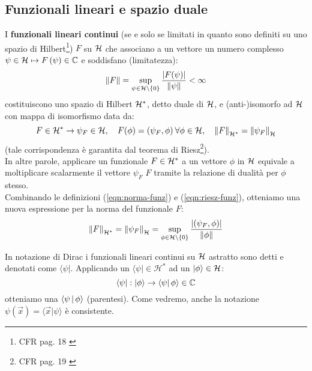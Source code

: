 \documentclass[FisicaTeorica.tex]{subfiles}
\begin{document}
\subsection{Funzionali lineari e spazio duale}
I \textbf{funzionali lineari continui} (se e solo se limitati in quanto sono definiti su uno spazio di Hilbert\footnote{CFR pag. 18 \cite{spazi_hilbert}}) $F$ su $\mathcal{H}$ che associano a un vettore un numero complesso $\psi\in\mathcal{H}\mapsto F\left(\psi\right)\in \mathbb{C}$ e soddisfano (limitatezza):
\begin{equation}
    \left\lVert F\right\rVert = \sup_{\psi \in \mathcal{H}\setminus \{0\}} \frac{|F(\psi)|}{\left\lVert\psi\right\rVert} < \infty
    \label{eqn:norma-funz}
\end{equation}
costituiscono uno spazio di Hilbert $\mathcal{H}^*$, detto duale di $\mathcal{H}$, e (anti-)isomorfo ad $\mathcal{H}$ con mappa di isomorfismo data da:
\begin{equation}
F\in \mathcal{H}^*\rightarrow \psi_F\in \mathcal{H}, \quad F(\phi) = (\psi_F, \phi)\> \forall \phi \in \mathcal{H}, \quad \left\lVert F\right\rVert_{\mathcal{H}^*}=\left\lVert\psi_F\right\rVert_{\mathcal{H}}
\label{eqn:riesz-funz}
\end{equation}
(tale corrispondenza è garantita dal teorema di Riesz\footnote{CFR pag. 19 \cite{spazi_hilbert}}).\\
In altre parole, applicare un funzionale $F \in \mathcal{H}^*$ a un vettore $\phi$ in $\mathcal{H}$ equivale a moltiplicare scalarmente il vettore $\psi_F$  $F$ tramite la relazione di dualità per $\phi$ stesso.\\
Combinando le definizioni (\ref{eqn:norma-funz}) e (\ref{eqn:riesz-funz}), otteniamo una nuova espressione per la norma del funzionale $F$: 
\begin{equation}
\left\lVert F\right\rVert_{\mathcal{H}^*} = \left\lVert\psi_F\right\rVert_{\mathcal{H}} = \sup_{\phi\in\mathcal{H} \setminus \{0\}} \frac{|(\psi_F,\phi)|}{\left\lVert\phi\right\rVert}
\label{eqn:normafunz}
\end{equation}

In notazione di Dirac i funzionali lineari continui su $\mathcal{H}$ astratto sono detti  e denotati come $\langle\psi|$.
Applicando un  $\langle \psi |\in \mathcal{H}^*$ ad un  $\left|\phi\right\rangle\in \mathcal{H}$:
\[
\left\langle\psi\right|:\left|\phi\right\rangle\rightarrow \left\langle\psi\right|\phi \rangle \in \mathbb{C}
\]
otteniamo una  $\Braket{\psi|\phi}$ (parentesi).
Come vedremo, anche la notazione $\psi \left(\vec{x}\right)=\langle \vec{x}|\psi \rangle$  è  consistente.\\
\end{document}
